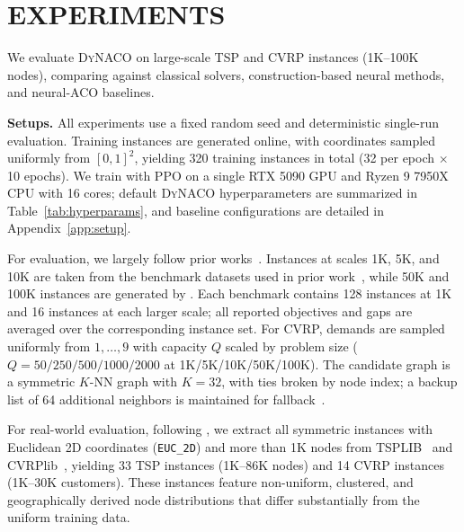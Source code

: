 \documentclass[sigconf]{acmart}
\newcommand{\DyNACO}{\textsc{DyNACO}}
\begin{document}
\section{EXPERIMENTS}
\label{sec:experiments}

We evaluate \DyNACO{} on large-scale TSP and CVRP instances (1K--100K nodes), comparing against classical solvers, construction-based neural methods, and neural-ACO baselines.


\smallskip\noindent\textbf{Setups.}
All experiments use a fixed random seed and deterministic single-run evaluation. Training instances are generated online, with coordinates sampled uniformly from $[0,1]^2$, yielding 320 training instances in total (32 per epoch $\times$ 10 epochs). We train with PPO on a single RTX 5090 GPU and Ryzen 9 7950X CPU with 16 cores; default \DyNACO{} hyperparameters are summarized in Table~\ref{tab:hyperparams}, and baseline configurations are detailed in Appendix~\ref{app:setup}.

For evaluation, we largely follow prior works~\cite{attentionmodel,pomo,lehd,sil}. Instances at scales 1K, 5K, and 10K are taken from the benchmark datasets used in prior work~\cite{attentionmodel,pomo,lehd}, while 50K and 100K instances are generated by \cite{sil}. Each benchmark contains 128 instances at 1K and 16 instances at each larger scale; all reported objectives and gaps are averaged over the corresponding instance set. For CVRP, demands are sampled uniformly from ${1,\ldots,9}$ with capacity $Q$ scaled by problem size ($Q{=}50/250/500/1000/2000$ at 1K/5K/10K/50K/100K). The candidate graph is a symmetric $K$-NN graph with $K{=}32$, with ties broken by node index; a backup list of 64 additional neighbors is maintained for fallback~\cite{ACOTSP-MF}.

For real-world evaluation, following \cite{sil}, we extract all symmetric instances with Euclidean 2D coordinates (\texttt{EUC\_2D}) and more than 1K nodes from TSPLIB~\cite{tsplib} and CVRPlib~\cite{cvrplib}, yielding 33 TSP instances (1K--86K nodes) and 14 CVRP instances (1K--30K customers). These instances feature non-uniform, clustered, and geographically derived node distributions that differ substantially from the uniform training data.
\end{document}
